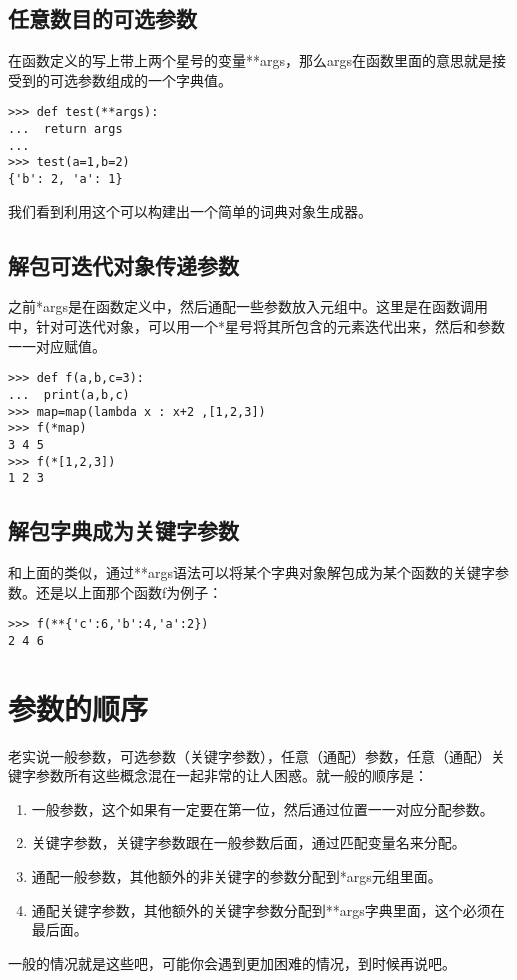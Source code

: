 \documentclass[12pt,oneside]{book}
\begin{document}
\begin{common-format}
\subsection{任意数目的可选参数}
在函数定义的写上带上两个星号的变量**args，那么args在函数里面的意思就是接受到的可选参数组成的一个字典值。
\begin{Verbatim}
>>> def test(**args):
...  return args
... 
>>> test(a=1,b=2)
{'b': 2, 'a': 1}
\end{Verbatim}

我们看到利用这个可以构建出一个简单的词典对象生成器。

\subsection{解包可迭代对象传递参数}
之前*args是在函数定义中，然后通配一些参数放入元组中。这里是在函数调用中，针对可迭代对象，可以用一个*星号将其所包含的元素迭代出来，然后和参数一一对应赋值。
\begin{Verbatim}
>>> def f(a,b,c=3):
...  print(a,b,c)
>>> map=map(lambda x : x+2 ,[1,2,3])
>>> f(*map)
3 4 5
>>> f(*[1,2,3])
1 2 3
\end{Verbatim}

\subsection{解包字典成为关键字参数}
和上面的类似，通过**args语法可以将某个字典对象解包成为某个函数的关键字参数。还是以上面那个函数f为例子：
\begin{Verbatim}
>>> f(**{'c':6,'b':4,'a':2})
2 4 6
\end{Verbatim}



\section{参数的顺序}
老实说一般参数，可选参数（关键字参数），任意（通配）参数，任意（通配）关键字参数所有这些概念混在一起非常的让人困惑。就一般的顺序是：
\begin{enumerate}
\item 一般参数，这个如果有一定要在第一位，然后通过位置一一对应分配参数。
\item 关键字参数，关键字参数跟在一般参数后面，通过匹配变量名来分配。
\item 通配一般参数，其他额外的非关键字的参数分配到*args元组里面。
\item 通配关键字参数，其他额外的关键字参数分配到**args字典里面，这个必须在最后面。
\end{enumerate}
一般的情况就是这些吧，可能你会遇到更加困难的情况，到时候再说吧。




\end{common-format}
\end{document}
